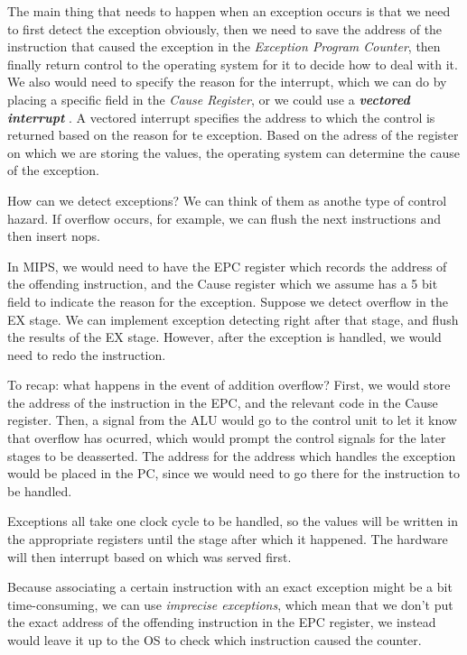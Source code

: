 \documentclass{article}
\begin{document}
The main thing that needs to happen when an exception occurs is that we need to first detect the 
exception obviously, then we need to save the address of the instruction that caused the exception in 
the \textit{Exception Program Counter}, then finally return control to the operating system for it to 
decide how to deal with it. We also would need to specify the reason for the interrupt, which we can do 
by placing a specific field in the \textit{Cause Register}, or we could use a 
\textbf{\textit{vectored interrupt }}. A vectored interrupt specifies the address to which the control is 
returned based on the reason for te exception. Based on the adress of the register on which we are 
storing the values, the operating system can determine the cause of the exception. 

How can we detect exceptions? We can think of them as anothe type of control hazard. If overflow occurs,
for example, we can flush the next instructions and then insert nops.

In MIPS, we would need to have the EPC register which records the address of the offending instruction,
and the Cause register which we assume has a 5 bit field to indicate the reason for the exception.
Suppose we detect overflow in the EX stage. We can implement exception detecting right after that stage,
and flush the results of the EX stage. However, after the exception is handled, we would need to 
redo the instruction.

To recap: what happens in the event of addition overflow? First, we would store the address of the 
instruction in the EPC, and the relevant code in the Cause register. Then, a signal from the ALU 
would go to the control unit to let it know that overflow has ocurred, which would prompt the 
control signals for the later stages to be deasserted. The address for the address which handles
the exception would be placed in the PC, since we would need to go there for the instruction to 
be handled.

Exceptions all take one clock cycle to be handled, so the values will be written in the appropriate
registers until the stage after which it happened. The hardware will then interrupt based on which
was served first.

Because associating a certain instruction with an exact exception might be a bit time-consuming,
we can use \textit{imprecise exceptions}, which mean that we don't put the exact address of the
offending instruction in the EPC register, we instead would leave it up to the OS to check 
which instruction caused the counter.
\end{document}
